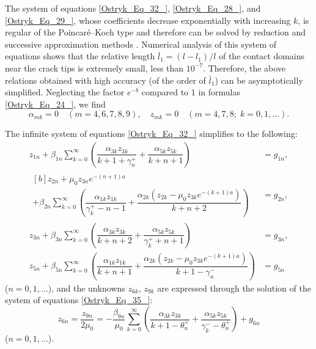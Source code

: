 The system of equations \eqref{Ostryk_Eq_32_}, \eqref{Ostryk_Eq_28_}, and \eqref{Ostryk_Eq_29_}, whose coefficients decrease exponentially with increasing $k$, is regular of the Poincaré--Koch type and therefore can be solved by reduction and successive approximation methods \cite{Ostryk74}. Numerical analysis of this system of equations shows that the relative length $\bar{l}_{1} =(l-l_{1} )/l$ of the contact domains near the crack tips is extremely small, less than $10^{-7}$. Therefore, the above relations obtained with high accuracy (of the order of $\bar{l}_{1} $) can be asymptotically simplified. Neglecting the factor $e^{-b} $ compared to 1 in formulas \eqref{Ostryk_Eq_24_}, we find
\begin{equation} \label{Ostryk_Eq_34_} 
\alpha _{mk} =0  \quad (m=4,6,7, 8,9),\quad    z_{mk} =0 \quad  (m=4,7,8;\; k=0,1,\dots).  
\end{equation} 

The infinite system of equations \eqref{Ostryk_Eq_32_} simplifies to the following:
\begin{equation} \label{Ostryk_Eq_35_} 
\begin{aligned}
	z_{1n} +\beta _{1n} \displaystyle\sum _{k=0}^{\infty }\left(\dfrac{\alpha _{3k} z_{3k} }{k+1+\gamma _{n}^{+} } +\dfrac{\alpha _{5k} z_{5k} }{k+n+1} \right) &=g_{1n} ,
	\\
	\begin{multlined}[b]
		z_{2n} +\mu _{0} z_{3n} e^{-(n+1)a} 
		\\
		+\beta _{2n} \sum _{k=0}^{\infty }\left(\dfrac{\alpha _{1k} z_{1k} }{\gamma _{k}^{+} -n-1} 
		+\dfrac{\alpha _{2k} (z_{2k} -\mu _{0} z_{3k} e^{-(k+1)a} )}{k+n+2} \right) 
	\end{multlined}&=g_{2n} ,
	\\
	z_{3n} +\beta _{3n} \displaystyle\sum _{k=0}^{\infty }\left(\dfrac{\alpha _{3k} z_{3k} }{k+n+2} +\dfrac{\alpha _{5k} z_{5k} }{\gamma _{k}^{+} +n+1} \right) &=g_{3n} ,
	\\
	z_{5n} +\beta _{5n} \displaystyle\sum _{k=0}^{\infty }\left(\dfrac{\alpha _{1k} z_{1k} }{k+n+1} +\dfrac{\alpha _{2k} (z_{2k} -\mu _{0} z_{3k} e^{-(k+1)a} )}{k+1-\gamma _{n}^{-} } \right) &=g_{5n}  
\end{aligned}
\end{equation}
($n=0,1,\dots$),  
and the unknowns $z_{6k} $, $z_{9k} $ are expressed through the solution of the system of equations \eqref{Ostryk_Eq_35_}:
\begin{equation} \label{Ostryk_Eq_36_} 
z_{6n} =\dfrac{z_{9n} }{2\mu _{0} } =-\dfrac{\beta _{9n} }{\mu _{0} } \sum _{k=0}^{\infty }\left(\dfrac{\alpha _{3k} z_{3k} }{k+1-\theta _{n}^{+} } +\dfrac{\alpha _{5k} z_{5k} }{\gamma _{k}^{-} -\theta _{n}^{+} } \right) +g_{6n}     
\end{equation} 
($n=0,1,\dots$).

